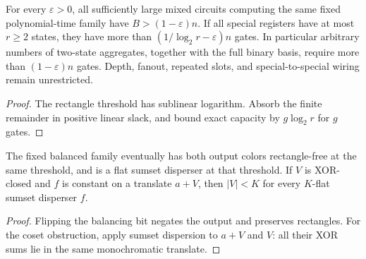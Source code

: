 \begin{theorem}
  \label{thm:lowerbounds-algebraic-aggregate-capacity-explicit}
  \leanok
  For every $\varepsilon>0$, all sufficiently large mixed circuits computing the
  same fixed polynomial-time family have $B>(1-\varepsilon)n$. If all special
  registers have at most $r\ge2$ states, they have more than
  $(1/\log_2r-\varepsilon)n$ gates. In particular arbitrary numbers of two-state
  aggregates, together with the full binary basis, require more than
  $(1-\varepsilon)n$ gates. Depth, fanout, repeated slots, and special-to-special
  wiring remain unrestricted.
\end{theorem}
\begin{proof}
  \leanok
  The rectangle threshold has sublinear logarithm. Absorb the finite remainder
  in positive linear slack, and bound exact capacity by $g\log_2r$ for $g$ gates.
\end{proof}

\begin{theorem}
  \label{thm:lowerbounds-algebraic-aggregate-capacity-polarity}
  \leanok
  The fixed balanced family eventually has both output colors rectangle-free at
  the same threshold, and is a flat sumset disperser at that threshold. If $V$ is
  XOR-closed and $f$ is constant on a translate $a+V$, then $|V|<K$ for every
  $K$-flat sumset disperser $f$.
\end{theorem}
\begin{proof}
  \leanok
  Flipping the balancing bit negates the output and preserves rectangles. For the
  coset obstruction, apply sumset dispersion to $a+V$ and $V$: all their XOR sums
  lie in the same monochromatic translate.
\end{proof}

